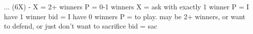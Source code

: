 ... (6X) - 
X = 2+ winners
P = 0-1 winners
    X = ask with exactly 1 winner
        P = I have 1 winner
        bid = I have 0 winners
    P = to play. may be 2+ winners, or want to defend, or just don't want to sacrifice
    bid = sac